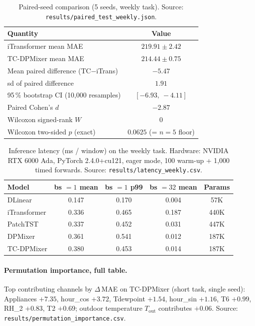 \documentclass{article}
\begin{document}
\begin{table}[h]
\centering
\caption{Paired-seed comparison (5 seeds, weekly task).
Source: \texttt{results/paired\_test\_weekly.json}.}
\label{tab:paired}
\small
\begin{tabular}{lc}
\toprule
Quantity & Value \\
\midrule
iTransformer mean MAE             & $219.91 \pm 2.42$ \\
TC-DPMixer mean MAE               & $214.44 \pm 0.75$ \\
Mean paired difference (TC$-$iTrans) & $-5.47$ \\
sd of paired difference              & $1.91$ \\
95\,\% bootstrap CI (10{,}000 resamples) & $[-6.93,\ -4.11]$ \\
Paired Cohen's $d$                & $-2.87$ \\
Wilcoxon signed-rank $W$          & $0$ \\
Wilcoxon two-sided $p$ (exact)    & $0.0625$ (= $n{=}5$ floor) \\
\bottomrule
\end{tabular}
\end{table}

\begin{table}[h]
\centering
\caption{Inference latency (ms / window) on the weekly task.
Hardware: NVIDIA RTX 6000 Ada, PyTorch 2.4.0+cu121, eager mode,
100 warm-up + 1{,}000 timed forwards. Source:
\texttt{results/latency\_weekly.csv}.}
\label{tab:lat}
\small
\begin{tabular}{lcccc}
\toprule
Model        & bs $=1$ mean & bs $=1$ p99 & bs $=32$ mean & Params \\
\midrule
DLinear      & 0.147 & 0.170 & 0.004 & 57K  \\
iTransformer & 0.336 & 0.465 & 0.187 & 440K \\
PatchTST     & 0.337 & 0.452 & 0.031 & 447K \\
DPMixer      & 0.361 & 0.541 & 0.012 & 187K \\
TC-DPMixer   & 0.380 & 0.453 & 0.014 & 187K \\
\bottomrule
\end{tabular}
\end{table}

\paragraph{Permutation importance, full table.}
Top contributing channels by $\Delta$\,MAE on TC-DPMixer
(short task, single seed):
Appliances $+7.35$, hour\_cos $+3.72$, Tdewpoint $+1.54$,
hour\_sin $+1.16$, T6 $+0.99$, RH\_2 $+0.83$, T2 $+0.69$;
outdoor temperature $T_\text{out}$ contributes $+0.06$.
Source: \texttt{results/permutation\_importance.csv}.
\end{document}
